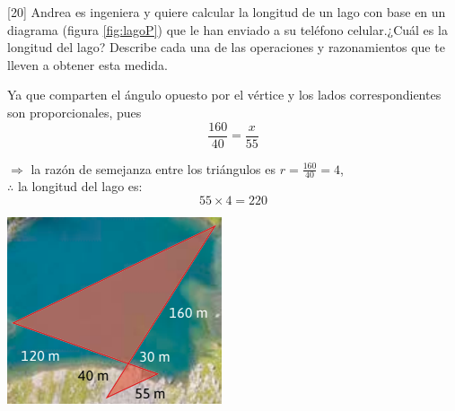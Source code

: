 [20] Andrea es ingeniera y quiere calcular la longitud de un lago con base en un diagrama (figura \ref{fig:lagoP}) que le han
enviado a su teléfono celular.¿Cuál es la longitud del lago? Describe cada una de las
operaciones y razonamientos que te lleven a obtener esta medida.

\begin{minipage}{0.4\linewidth}
    \begin{solutionbox}{8cm}
        Ya que comparten el ángulo opuesto por el vértice y los lados correspondientes son proporcionales, pues
        \[\frac{160}{40} = \frac{x}{55}\]

        $\Rightarrow$ la raz\'on de semejanza entre los tri\'angulos es $r=\frac{160}{40}=4$,\\

        $\therefore$ la longitud del lago es:
        \[
            55 \times 4  =220
        \]
    \end{solutionbox}
\end{minipage}\hfill
\begin{minipage}{0.5\linewidth}
    \captionsetup{width=1.2\linewidth}
    \includegraphics{Images/lagoP}
    \label{fig:lagoP}
\end{minipage}
